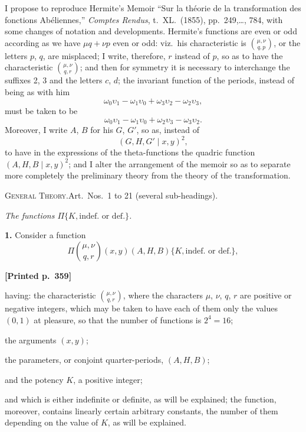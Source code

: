 \documentclass[11pt]{article}
\begin{document}
I propose to reproduce Hermite's Memoir ``Sur la th\'eorie de la transformation des fonctions Ab\'eliennes,'' \textit{Comptes Rendus}, t.~XL.\ (1855), pp.~249,\ldots, 784, with some changes of notation and developments. Hermite's functions are even or odd according as we have $\mu q+\nu p$ even or odd: viz.\ his characteristic is $\binom{\mu,\nu}{q,p}$, or the letters $p$, $q$, are misplaced; I write, therefore, $r$ instead of $p$, so as to have the characteristic $\binom{\mu,\nu}{q,r}$; and then for symmetry it is necessary to interchange the suffixes 2, 3 and the letters $c$, $d$; the invariant function of the periods, instead of being as with him
\[
\omega_{0}\upsilon_{1}-\omega_{1}\upsilon_{0}+\omega_{3}\upsilon_{2}-\omega_{2}\upsilon_{3},
\]
must be taken to be
\[
\omega_{0}\upsilon_{1}-\omega_{1}\upsilon_{0}+\omega_{2}\upsilon_{3}-\omega_{3}\upsilon_{2}.
\]
Moreover, I write $A$, $B$ for his $G$, $G'$, so as, instead of
\[
(G,H,G' \mid x,y)^{2},
\]
to have in the expressions of the theta-functions the quadric function $(A,H,B \mid x,y)^{2}$; and I alter the arrangement of the memoir so as to separate more completely the preliminary theory from the theory of the transformation.

\medskip

\noindent\textsc{General Theory.}\quad Art.\ Nos.~1 to 21 (several sub-headings).

\medskip

\begin{center}\textit{The functions $\Pi\{K,\text{indef.\ or def.}\}$.}\end{center}

\noindent\textbf{1.} Consider a function
\[
\Pi\!\binom{\mu,\nu}{q,r}(x,y)(A,H,B)\{K,\text{indef.\ or def.}\},
\]

\medskip
\noindent\textbf{[Printed p.~359]}\hfill

having: the characteristic $\binom{\mu,\nu}{q,r}$, where the characters $\mu$, $\nu$, $q$, $r$ are positive or negative integers, which may be taken to have each of them only the values $(0,1)$ at pleasure, so that the number of functions is $2^{4}=16$;

the arguments $(x,y)$;

the parameters, or conjoint quarter-periods, $(A,H,B)$;

and the potency $K$, a positive integer;

and which is either indefinite or definite, as will be explained; the function, moreover, contains linearly certain arbitrary constants, the number of them depending on the value of $K$, as will be explained.
\end{document}

